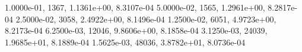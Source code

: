 1.0000e-01,  1367, 1.1361e+00, 8.3107e-04
5.0000e-02,  1565, 1.2961e+00, 8.2817e-04
2.5000e-02,  3058, 2.4922e+00, 8.1496e-04
1.2500e-02,  6051, 4.9723e+00, 8.2173e-04
6.2500e-03, 12046, 9.8606e+00, 8.1858e-04
3.1250e-03, 24039, 1.9685e+01, 8.1889e-04
1.5625e-03, 48036, 3.8782e+01, 8.0736e-04
